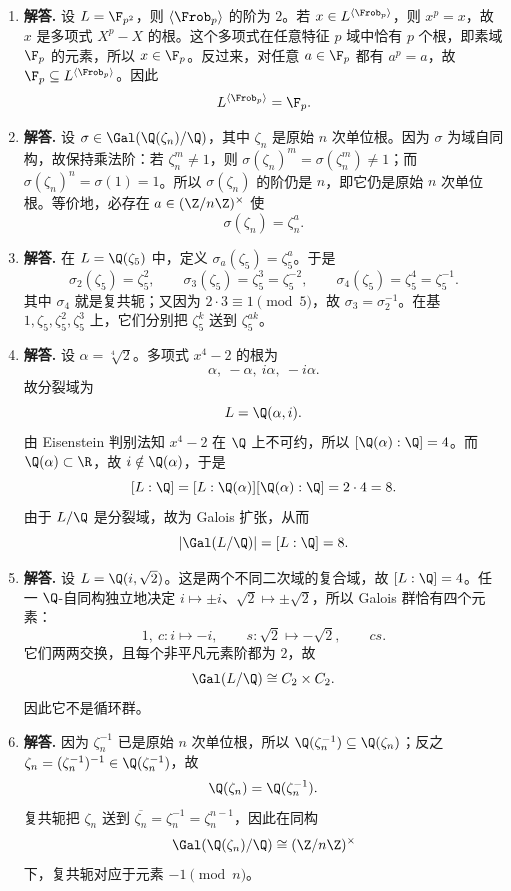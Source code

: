\begin{enumerate}[label=\textbf{\arabic*.}, leftmargin=*, itemsep=1em]
\item \textbf{解答.} 设 $L=\F_{p^2}$，则 $\langle\Frob_p\rangle$ 的阶为 $2$。若 $x\in L^{\langle\Frob_p\rangle}$，则 $x^p=x$，故 $x$ 是多项式 $X^p-X$ 的根。这个多项式在任意特征 $p$ 域中恰有 $p$ 个根，即素域 $\F_p$ 的元素，所以 $x\in\F_p$。反过来，对任意 $a\in\F_p$ 都有 $a^p=a$，故 $\F_p\subseteq L^{\langle\Frob_p\rangle}$。因此
\[
L^{\langle\Frob_p\rangle}=\F_p.
\]

\item \textbf{解答.} 设 $\sigma\in\Gal(\Q(\zeta_n)/\Q)$，其中 $\zeta_n$ 是原始 $n$ 次单位根。因为 $\sigma$ 为域自同构，故保持乘法阶：若 $\zeta_n^m\neq1$，则 $\sigma(\zeta_n)^m=\sigma(\zeta_n^m)\neq1$；而 $\sigma(\zeta_n)^n=\sigma(1)=1$。所以 $\sigma(\zeta_n)$ 的阶仍是 $n$，即它仍是原始 $n$ 次单位根。等价地，必存在 $a\in(\Z/n\Z)^\times$ 使
\[
\sigma(\zeta_n)=\zeta_n^a.
\]

\item \textbf{解答.} 在 $L=\Q(\zeta_5)$ 中，定义 $\sigma_a(\zeta_5)=\zeta_5^a$。于是
\[
\sigma_2(\zeta_5)=\zeta_5^2,
\qquad
\sigma_3(\zeta_5)=\zeta_5^3=\zeta_5^{-2},
\qquad
\sigma_4(\zeta_5)=\zeta_5^4=\zeta_5^{-1}.
\]
其中 $\sigma_4$ 就是复共轭；又因为 $2\cdot3\equiv1\pmod5$，故 $\sigma_3=\sigma_2^{-1}$。在基 $1,\zeta_5,\zeta_5^2,\zeta_5^3$ 上，它们分别把 $\zeta_5^k$ 送到 $\zeta_5^{ak}$。

\item \textbf{解答.} 设 $\alpha=\sqrt[4]{2}$。多项式 $x^4-2$ 的根为
\[
\alpha,\ -\alpha,\ i\alpha,\ -i\alpha.
\]
故分裂域为
\[
L=\Q(\alpha,i).
\]
由 Eisenstein 判别法知 $x^4-2$ 在 $\Q$ 上不可约，所以 $[\Q(\alpha):\Q]=4$。而 $\Q(\alpha)\subset\R$，故 $i\notin\Q(\alpha)$，于是
\[
[L:\Q]=[L:\Q(\alpha)][\Q(\alpha):\Q]=2\cdot4=8.
\]
由于 $L/\Q$ 是分裂域，故为 Galois 扩张，从而
\[
|\Gal(L/\Q)|=[L:\Q]=8.
\]

\item \textbf{解答.} 设 $L=\Q(i,\sqrt2)$。这是两个不同二次域的复合域，故 $[L:\Q]=4$。任一 $\Q$-自同构独立地决定 $i\mapsto\pm i$、$\sqrt2\mapsto\pm\sqrt2$，所以 Galois 群恰有四个元素：
\[
1,\ c:i\mapsto-i,
\qquad s:\sqrt2\mapsto-\sqrt2,
\qquad cs.
\]
它们两两交换，且每个非平凡元素阶都为 $2$，故
\[
\Gal(L/\Q)\cong C_2\times C_2.
\]
因此它不是循环群。

\item \textbf{解答.} 因为 $\zeta_n^{-1}$ 已是原始 $n$ 次单位根，所以 $\Q(\zeta_n^{-1})\subseteq\Q(\zeta_n)$；反之 $\zeta_n=(\zeta_n^{-1})^{-1}\in\Q(\zeta_n^{-1})$，故
\[
\Q(\zeta_n)=\Q(\zeta_n^{-1}).
\]
复共轭把 $\zeta_n$ 送到 $\overline{\zeta_n}=\zeta_n^{-1}=\zeta_n^{n-1}$，因此在同构
\[
\Gal(\Q(\zeta_n)/\Q)\cong (\Z/n\Z)^\times
\]
下，复共轭对应于元素 $-1\pmod n$。


\end{enumerate}
